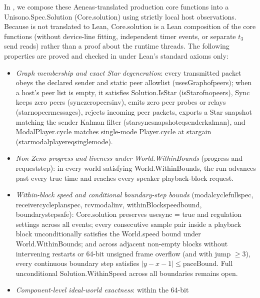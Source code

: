 \documentclass[11pt,a4paper]{article}
\DeclareRobustCommand{\lean}[1]{{\ttfamily\def\_{\textunderscore\allowbreak}#1}}
\theoremstyle{definition}
\begin{document}
In , we compose these Aeneas-translated
production core functions into a \lean{Unisono.Spec.Solution} (\lean{Core.solution})
using strictly local host observations. Because  is not
translated to Lean, \lean{Core.solution} is a Lean composition of the core
functions (without device-line fitting, independent timer events, or separate
$t_3$ send reads) rather than a proof about the runtime threads. The following
properties are proved and checked in  under
Lean's standard axioms only:
\begin{itemize}
\item \emph{Graph membership and exact Star degeneration}: every transmitted
  packet obeys the declared sender and static peer allowlist
  (\lean{usesGraph\_of\_peers}); when a host's peer list is empty, it
  satisfies \lean{Solution.IsStar} (\lean{isStar\_of\_no\_peers}), \lean{Sync}
  keeps zero peers (\lean{sync\_zero\_peers\_inv}), emits zero peer probes or
  relays (\lean{star\_no\_peer\_messages}), rejects incoming peer packets,
  exports a Star snapshot matching the sender Kalman filter
  (\lean{star\_sync\_snapshot\_eq\_sender\_kalman}), and
  \lean{ModalPlayer.\allowbreak cycle} matches single-mode
  \lean{Player.\allowbreak cycle} at \lean{star\_gain}
  (\lean{star\_modal\_player\_eq\_single\_mode}).
\item \emph{Non-Zeno progress and liveness under
  \lean{World.\allowbreak WithinBounds}} (\lean{progress} and
  \lean{request\_step}): in every world satisfying
  \lean{World.\allowbreak WithinBounds}, the run advances past every true time
  and reaches every speaker playback-block request.
\item \emph{Within-block speed and conditional boundary-step bounds}
  (\lean{modal\_cycle\_full\_spec}, \lean{receiver\_cycle\_plan\_spec},
  \lean{rcv\_modal\_inv}, \lean{withinBlock\_speed\_bound},
  \lean{boundary\_step\_safe}): \lean{Core.\allowbreak solution} preserves
  \lean{use\_sync = true} and regulation settings across all events; every
  consecutive sample pair inside a playback block unconditionally satisfies the
  \lean{World.\allowbreak speed} bound under
  \lean{World.\allowbreak WithinBounds}; and across adjacent non-empty blocks
  without intervening restarts or 64-bit unsigned frame overflow (and with
  \lean{jump} $\ge 3$), every continuous boundary step satisfies
  $|y - x - 1| \le \mathrm{paceBound}$. Full unconditional
  \lean{Solution.\allowbreak WithinSpeed} across all boundaries remains open.
\item \emph{Component-level ideal-world exactness}: within the 64-bit

\end{itemize}
\end{document}
